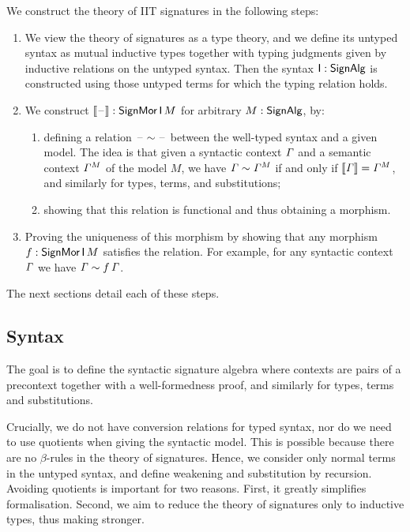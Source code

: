 


We construct the theory of IIT signatures in the following steps:
\begin{enumerate}
\item We view the theory of signatures as a type theory, and we define
  its untyped syntax as mutual inductive types together with typing
  judgments given by inductive relations on the untyped syntax. Then
  the syntax $\mathsf{I} : \mathsf{SignAlg}$ is constructed using those untyped terms
  for which the typing relation holds.
\item We construct $\llbracket\mathord{\hspace{1pt}\text{--}\hspace{1pt}}\rrbracket:\mathsf{SignMor}\,\mathsf{I}\,M$ for arbitrary
  $M : \mathsf{SignAlg}$, by:
  \begin{enumerate}
  \item defining a relation $\mathord{\hspace{1pt}\text{--}\hspace{1pt}} \sim \mathord{\hspace{1pt}\text{--}\hspace{1pt}}$ between the well-typed syntax
    and a given model. The idea is that given a syntactic context $\mathit{\Gamma}$ and a
    semantic context ${\mathit{\Gamma}}^M$ of the model $M$, we have
    $\mathit{\Gamma} \sim {\mathit{\Gamma}}^M$ if and only if $\llbracket\mathit{\Gamma}\rrbracket
    = {\mathit{\Gamma}}^M$, and similarly for types, terms, and substitutions;
  \item showing that this relation is functional and thus obtaining a morphism.
    \end{enumerate}
  \item Proving the uniqueness of this morphism by showing that any morphism
    $f:\mathsf{SignMor}\,\mathsf{I}\,M$ satisfies the relation. For example, for any syntactic context
    $\mathit{\Gamma}$ we have $\mathit{\Gamma}\sim f\,\mathit{\Gamma}$.
\end{enumerate}
The next sections detail each of these steps.

\subsection{Syntax}

The goal is to define the syntactic signature algebra where contexts
are pairs of a precontext together with a well-formedness proof, and
similarly for types, terms and substitutions.

Crucially, we do not have conversion relations for typed syntax, nor
do we need to use quotients when giving the syntactic model. This is
possible because there are no $\beta$-rules in the theory of
signatures. Hence, we consider only normal terms in the untyped
syntax, and define weakening and substitution by recursion.  Avoiding
quotients is important for two reasons. First, it greatly simplifies
formalisation. Second, we aim to reduce the theory of signatures only
to inductive types, thus making  stronger.

